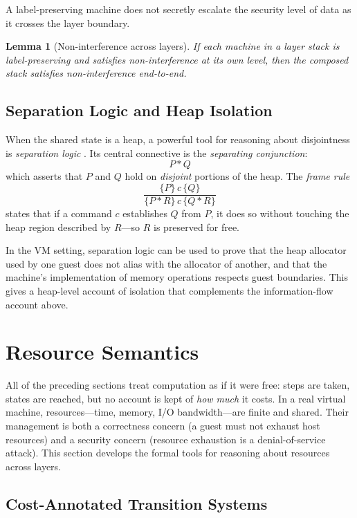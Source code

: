 \documentclass[11pt, a4paper]{article}
\theoremstyle{definition}
\theoremstyle{plain}
\newtheorem{lemma}[definition]{Lemma}
\theoremstyle{remark}
\begin{document}
A label-preserving machine does not secretly escalate the security level of
data as it crosses the layer boundary.

\begin{lemma}[Non-interference across layers]
  If each machine in a layer stack is label-preserving and satisfies
  non-interference at its own level, then the composed stack satisfies
  non-interference end-to-end.
\end{lemma}

\subsection{Separation Logic and Heap Isolation}

When the shared state is a heap, a powerful tool for reasoning about
disjointness is \emph{separation logic} \citep{reynolds2002,ohearn2001}.
Its central connective is the \emph{separating conjunction}:
\[
  P * Q
\]
which asserts that $P$ and $Q$ hold on \emph{disjoint} portions of the heap.
The \emph{frame rule}
\[
  \frac{\{P\}\, c\, \{Q\}}{\{P * R\}\, c\, \{Q * R\}}
\]
states that if a command $c$ establishes $Q$ from $P$, it does so without
touching the heap region described by $R$---so $R$ is preserved for free.

In the VM setting, separation logic can be used to prove that the heap
allocator used by one guest does not alias with the allocator of another,
and that the machine's implementation of memory operations respects guest
boundaries. This gives a heap-level account of isolation that complements
the information-flow account above.


\section{Resource Semantics}
\label{sec:resources}

All of the preceding sections treat computation as if it were free: steps
are taken, states are reached, but no account is kept of \emph{how much}
it costs. In a real virtual machine, resources---time, memory, I/O
bandwidth---are finite and shared. Their management is both a correctness
concern (a guest must not exhaust host resources) and a security concern
(resource exhaustion is a denial-of-service attack). This section develops
the formal tools for reasoning about resources across layers.

\subsection{Cost-Annotated Transition Systems}
\end{document}
